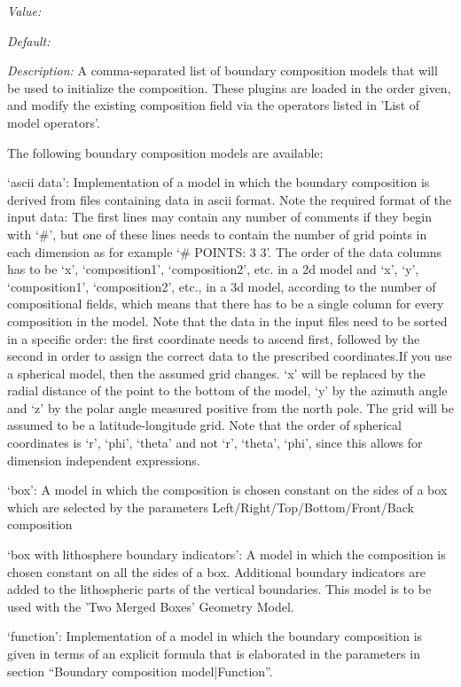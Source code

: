 \begin{itemize}
{\it Value:} 


{\it Default:} 


{\it Description:} A comma-separated list of boundary composition models that will be used to initialize the composition. These plugins are loaded in the order given, and modify the existing composition field via the operators listed in 'List of model operators'.

The following boundary composition models are available:

`ascii data': Implementation of a model in which the boundary composition is derived from files containing data in ascii format. Note the required format of the input data: The first lines may contain any number of comments if they begin with `#', but one of these lines needs to contain the number of grid points in each dimension as for example `# POINTS: 3 3'. The order of the data columns has to be `x', `composition1', `composition2', etc. in a 2d model and `x', `y', `composition1', `composition2', etc., in a 3d model, according to the number of compositional fields, which means that there has to be a single column for every composition in the model. Note that the data in the input files need to be sorted in a specific order: the first coordinate needs to ascend first, followed by the second in order to assign the correct data to the prescribed coordinates.If you use a spherical model, then the assumed grid changes. `x' will be replaced by the radial distance of the point to the bottom of the model, `y' by the azimuth angle and `z' by the polar angle measured positive from the north pole. The grid will be assumed to be a latitude-longitude grid. Note that the order of spherical coordinates is `r', `phi', `theta' and not `r', `theta', `phi', since this allows for dimension independent expressions.

`box': A model in which the composition is chosen constant on the sides of a box which are selected by the parameters Left/Right/Top/Bottom/Front/Back composition

`box with lithosphere boundary indicators': A model in which the composition is chosen constant on all the sides of a box. Additional boundary indicators are added to the lithospheric parts of the vertical boundaries. This model is to be used with the 'Two Merged Boxes' Geometry Model.

`function': Implementation of a model in which the boundary composition is given in terms of an explicit formula that is elaborated in the parameters in section ``Boundary composition model|Function''. 


\end{itemize}
